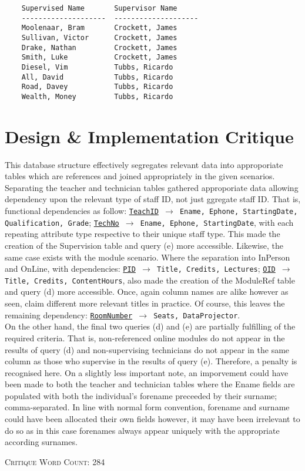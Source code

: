 \documentclass[11pt, english]{article}
\begin{document}
	{\scriptsize\begin{verbatim}
	Supervised Name       Supervisor Name
	--------------------  --------------------
	Moolenaar, Bram       Crockett, James
	Sullivan, Victor      Crockett, James
	Drake, Nathan         Crockett, James
	Smith, Luke           Crockett, James
	Diesel, Vim           Tubbs, Ricardo
	All, David            Tubbs, Ricardo
	Road, Davey           Tubbs, Ricardo
	Wealth, Money         Tubbs, Ricardo
	\end{verbatim}}
	
\newpage

\section{Design \& Implementation Critique}

	This database structure effectively segregates relevant data into approporiate tables which are references and joined appropriately in the given scenarios. Separating the teacher and technician tables gathered approporiate data allowing dependency upon the relevant type of staff ID, not just ggregate staff ID. That is, functional dependencies as follow: \texttt{\underline{TeachID} $\rightarrow$ Ename, Ephone, StartingDate, Qualification, Grade}; \texttt{\underline{TechNo} $\rightarrow$ Ename, Ephone, StartingDate}, with each repeating attribute type respective to their unique staff type. This made the creation of the Supervision table and query (e) more accessible. Likewise, the same case exists with the module scenario. Where the separation into InPerson and OnLine, with dependencies: \texttt{\underline{PID} $\rightarrow$ Title, Credits, Lectures}; \texttt{\underline{OID} $\rightarrow$ Title, Credits, ContentHours}, also made the creation of the ModuleRef table and query (d) more accessible. Once, again column names are alike however as seen, claim different more relevant titles in practice. Of course, this leaves the remaining dependency: \texttt{\underline{RoomNumber} $\rightarrow$ Seats, DataProjector}.\\

	On the other hand, the final two queries (d) and (e) are partially fulfilling of the required criteria. That is, non-referenced online modules do not appear in the results of query (d) and non-supervising technicians do not appear in the same column as those who supervise in the results of query (e). Therefore, a penalty is recognised here. On a slightly less important note, an imporvement could have been made to both the teacher and technician tables where the Ename fields are populated with both the individual's forename preceeded by their surname; comma-separated. In line with normal form convention, forename and surname could have been allocated their own fields however, it may have been irrelevant to do so as in this case forenames always appear uniquely with the appropriate according surnames.
	
	\vspace{\fill}

	\begin{center}
		\textsc{Critique Word Count: 284}
	\end{center}
\end{document}
